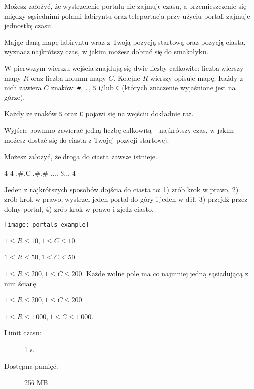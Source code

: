 \documentclass{boi2014-pl}
\newcommand{\constant}[1]{{\tt #1}}
\begin{document}
    Możesz założyć, że wystrzelenie portalu nie zajmuje czasu, a przemieszczenie się między sąsiednimi polami labiryntu oraz teleportacja przy użyciu portali zajmuje jednostkę czasu.

    \Task
    Mając daną mapę labiryntu wraz z Twoją pozycją startową oraz pozycją ciasta, wyznacz najkrótszy czas, w jakim możesz dobrać się do smakołyku.

    \Input
    W pierwszym wierszu wejścia znajdują się dwie liczby całkowite: liczba wierszy mapy $R$ oraz liczba kolumn mapy $C$.
    Kolejne $R$ wierszy opisuje mapę.
    Każdy z nich zawiera $C$ znaków: \constant{\#}, \constant{.}, \constant{S} i/lub \constant{C} (których znaczenie wyjaśnione jest na górze).

    Każdy ze znaków \constant{S} oraz \constant{C} pojawi się na wejściu dokładnie raz.

    \Output
    Wyjście powinno zawierać jedną liczbę całkowitą -- najkrótszy czas, w jakim możesz dostać się do ciasta z Twojej pozycji startowej.

    Możesz założyć, że droga do ciasta zawsze istnieje.

    \Example
    \example
    {
        4 4\newline
        .\#.C\newline
        .\#.\#\newline
        ....\newline
        S...
    }
    {
        4
    }
    {
        Jeden z najkrótszych sposobów dojścia do ciasta to: 1) zrób krok w prawo, 2) zrób krok w prawo, wystrzel jeden portal do góry i jeden w dół, 3) przejdź przez dolny portal, 4) zrób krok w prawo i zjedz ciasto.

        \begin{center}
            \texttt{[image: portals-example]}
        \end{center}
    }

    \Scoring

    \begin{description}[leftmargin=0pt]
        \item[Podzadanie 1 (11 punktów):] $1 \le R \le 10, 1 \le C \le 10$.
        \item[Podzadanie 2 (20 punktów):] $1 \le R \le 50, 1 \le C \le 50$.
        \item[Podzadanie 3 (20 punktów):] $1 \le R \le 200, 1 \le C \le 200$.
        Każde wolne pole ma co najmniej jedną sąsiadującą z nim ścianę.
        \item[Podzadanie 4 (19 punktów):] $1 \le R \le 200, 1 \le C \le 200$.
        \item[Podzadanie 5 (30 punktów):] $1 \le R \le 1\,000, 1 \le C \le 1\,000$.
    \end{description}

    \Constraints

    \begin{description}
        \item[Limit czasu:] 1 s.
        \item[Dostępna pamięć:] 256 MB.
    \end{description}
\end{document}
